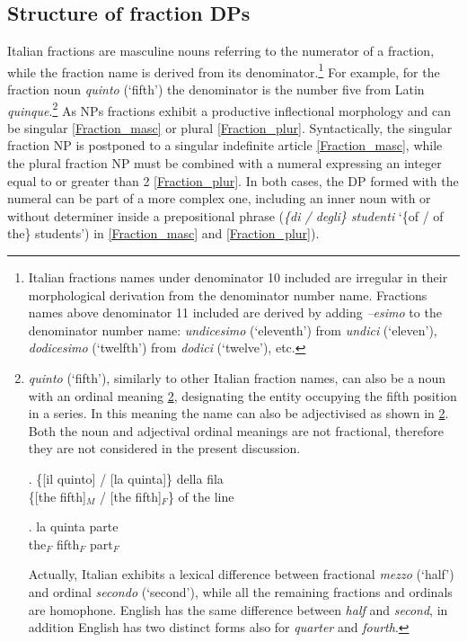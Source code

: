 \documentclass[charis, linguex]{glossa}
\begin{document}
\subsection{Structure of fraction DPs}  \label{SubSec-fractionsDP}

Italian fractions are masculine nouns referring to the numerator of a fraction, while the fraction name is derived from its denominator.\footnote{Italian fractions names under denominator 10 included are irregular in their morphological derivation from the denominator number name. Fractions names above denominator 11 included are derived by adding \textit{--esimo} to the denominator number name: \textit{undicesimo} (`eleventh') from \textit{undici} (`eleven'), \textit{dodicesimo} (`twelfth') from \textit{dodici} (`twelve'), etc.} For example, for the fraction noun \textit{quinto} (`fifth') the denominator is the number five from Latin \textit{quinque}.\footnote{\textit{quinto} (`fifth'), similarly to other Italian fraction names, can also be a noun with an ordinal meaning \ref{ordinalname}, designating the entity occupying the fifth position in a series. In this meaning the name can also be adjectivised as shown in \ref{ordinaladj}. Both the noun and adjectival ordinal meanings are not fractional, therefore they are not considered  in the present discussion.

\exg. \{[il  quinto] / [la quinta]\}  della fila \\
          \{[the fifth]$_{M}$ / [the fifth]$_{F}$\}  {of the} line \\ \label{ordinalname}

\exg. la quinta parte \\
      the$_{F}$ fifth$_{F}$ part$_{F}$ \\  \label{ordinaladj}
	  
Actually, Italian exhibits a lexical difference between fractional \textit{mezzo} (`half') and ordinal \textit{secondo} (`second'), while all the remaining fractions and ordinals are homophone.  English has the same difference between \textit{half} and \textit{second}, in addition English has  two distinct forms also for \textit{quarter} and \textit{fourth}. } As NPs fractions exhibit a productive inflectional morphology and can be singular \ref{Fraction_masc} or plural \ref{Fraction_plur}. Syntactically, the singular fraction NP is postponed to a singular indefinite article \ref{Fraction_masc}, while the plural fraction NP must be combined with a numeral expressing an integer equal to or greater than 2 \ref{Fraction_plur}.  In both cases, the DP formed with the numeral can be part of a more complex one, including an inner noun with or without determiner inside a prepositional phrase (\textit{\{di / degli\} studenti} `\{of / {of the}\} students') in \ref{Fraction_masc} and \ref{Fraction_plur}). 
\end{document}
